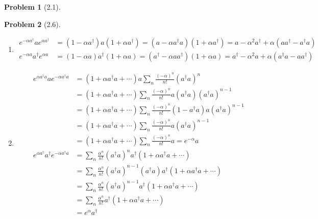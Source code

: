 \documentclass[twoside,11pt]{article}
\theoremstyle{definition}
\newtheorem{problem}{Problem}
\theoremstyle{remark}
\begin{document}
\begin{problem}[2.1]
\end{problem}


\begin{problem}[2.6]\
\begin{enumerate}[label=(\alph*)]
\item 
\begin{align*}
    e^{-\alpha a^\dagger} a e^{\alpha a^\dagger}
    &= (1 - \alpha a^\dagger) a (1 + \alpha a^\dagger)
    = (a - \alpha a^\dagger a)(1 + \alpha a^\dagger)
    = a - \alpha^2 a^\dagger + \alpha(aa^\dagger - a^\dagger a)\\
    e^{-\alpha a} a^\dagger e^{\alpha a}
    &= (1 - \alpha a) a^\dagger (1 + \alpha a)
    = (a^\dagger - \alpha aa^\dagger) (1+\alpha a)
    = a^\dagger - \alpha^2 a + \alpha(a^\dagger a - aa^\dagger)
\end{align*}

\item 
\begin{align*}
    e^{\alpha a^\dagger a}a e^{-\alpha a^\dagger a}
    &= 
    (1 + \alpha a^\dagger a + \cdots) a \sum_n \frac{(-\alpha)^n}{n!}(a^\dagger a)^n\\
    &= (1 + \alpha a^\dagger a + \cdots) \sum_n\frac{(-\alpha)^n}{n!}a(a^\dagger a)(a^\dagger a)^{n-1}\\
    &= (1 + \alpha a^\dagger a + \cdots) \sum_n\frac{(-\alpha)^n}{n!}(1-a^\dagger a)a(a^\dagger a)^{n-1}\\
    &= (1 + \alpha a^\dagger a + \cdots) \sum_n\frac{(-\alpha)^n}{n!}a(a^\dagger a)^{n-1}\\
    &= (1 + \alpha a^\dagger a + \cdots) \sum_n\frac{(-\alpha)^n}{n!}a = e^{-\alpha} a\\
    e^{\alpha a^\dagger}a^\dagger e^{-\alpha a^\dagger a}
    &= \sum_n\frac{\alpha^n}{n!}(a^\dagger a)^n a^\dagger (1 + \alpha a^\dagger a + \cdots)\\
    &= \sum_n\frac{\alpha^n}{n!}(a^\dagger a)^{n-1}(a^\dagger a)a^\dagger (1 + \alpha a^\dagger a + \cdots)\\
    &= \sum_n\frac{\alpha^n}{n!}(a^\dagger a)^{n-1} a^\dagger(1 + \alpha a^\dagger a + \cdots)\\
    &= \sum_n\frac{\alpha^n}{n!}a^\dagger (1 + \alpha a^\dagger a + \cdots)\\
    &= e^{\alpha}a^\dagger
\end{align*}

\end{enumerate}
\end{problem}



\end{document}

